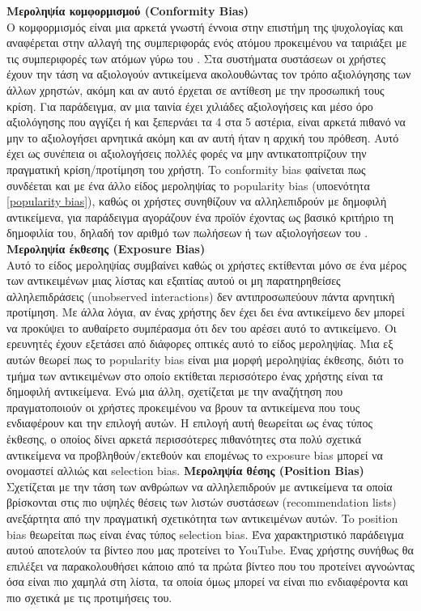 \noindent\textbf{Μεροληψία κομφορμισμού (Conformity Bias)}\\
Ο κομφορμισμός είναι μια αρκετά γνωστή έννοια στην επιστήμη της ψυχολογίας και αναφέρεται στην αλλαγή της συμπεριφοράς ενός ατόμου προκειμένου να ταιριάξει με τις συμπεριφορές των ατόμων γύρω του \cite{cialdiniSocialInfluenceCompliance2004}. Στα συστήματα συστάσεων οι χρήστες έχουν την τάση να αξιολογούν αντικείμενα ακολουθώντας τον τρόπο αξιολόγησης των άλλων χρηστών, ακόμη και αν αυτό έρχεται σε αντίθεση με την προσωπική τους κρίση. Για παράδειγμα, αν μια ταινία έχει χιλιάδες αξιολογήσεις και μέσο όρο αξιολόγησης που αγγίζει ή και ξεπερνάει τα 4 στα 5 αστέρια, είναι αρκετά πιθανό να μην το αξιολογήσει αρνητικά ακόμη και αν αυτή ήταν η αρχική του πρόθεση. Αυτό έχει ως συνέπεια οι αξιολογήσεις πολλές φορές να μην αντικατοπτρίζουν την πραγματική κρίση/προτίμηση του χρήστη. To conformity bias φαίνεται πως συνδέεται και με ένα άλλο είδος μεροληψίας το popularity bias (υποενότητα \ref{popularity bias}), καθώς οι χρήστες συνηθίζουν να αλληλεπιδρούν με δημοφιλή αντικείμενα, για παράδειγμα αγοράζουν ένα προϊόν έχοντας ως βασικό κριτήριο τη δημοφιλία του, δηλαδή τον αριθμό των πωλήσεων ή των αξιολογήσεων του \cite{zhengDisentanglingUserInterest2021a}.\\

\noindent\textbf{Μεροληψία έκθεσης (Exposure Bias)}\\
Αυτό το είδος μεροληψίας συμβαίνει καθώς οι χρήστες εκτίθενται μόνο σε ένα μέρος των αντικειμένων μιας λίστας και εξαιτίας αυτού οι μη παρατηρηθείσες αλληλεπιδράσεις (unobserved interactions) δεν αντιπροσωπεύουν πάντα αρνητική προτίμηση. Με άλλα λόγια, αν ένας χρήστης δεν έχει δει ένα αντικείμενο δεν μπορεί να προκύψει το αυθαίρετο συμπέρασμα ότι δεν του αρέσει αυτό το αντικείμενο. Οι ερευνητές έχουν εξετάσει από διάφορες οπτικές αυτό το είδος μεροληψίας. Μια εξ αυτών θεωρεί πως το popularity bias είναι μια μορφή μεροληψίας έκθεσης, διότι το τμήμα των αντικειμένων στο οποίο εκτίθεται περισσότερο ένας χρήστης είναι τα δημοφιλή αντικείμενα. Ενώ μια άλλη, σχετίζεται με την αναζήτηση που πραγματοποιούν οι χρήστες προκειμένου να βρουν τα αντικείμενα που τους ενδιαφέρουν και την επιλογή αυτών. Η επιλογή αυτή θεωρείται ως ένας τύπος έκθεσης, ο οποίος δίνει αρκετά περισσότερες πιθανότητες στα πολύ σχετικά αντικείμενα να προβληθούν/εκτεθούν και επομένως το exposure bias μπορεί να ονομαστεί αλλιώς και selection bias. 
\newpage
\noindent\textbf{Μεροληψία θέσης (Position Bias)}\\
Σχετίζεται με την τάση των ανθρώπων να αλληλεπιδρούν με αντικείμενα τα οποία βρίσκονται στις πιο υψηλές θέσεις των λιστών συστάσεων (recommendation lists) ανεξάρτητα από την πραγματική σχετικότητα των αντικειμένων αυτών. To position bias θεωρείται πως είναι ένας τύπος selection bias. Ένα χαρακτηριστικό παράδειγμα αυτού αποτελούν τα βίντεο που μας προτείνει το YouTube. Ένας χρήστης συνήθως θα επιλέξει να παρακολουθήσει κάποιο από τα πρώτα βίντεο που του προτείνει αγνοώντας όσα είναι πιο χαμηλά στη λίστα, τα οποία όμως μπορεί να είναι πιο ενδιαφέροντα και πιο σχετικά με τις προτιμήσεις του.\\


